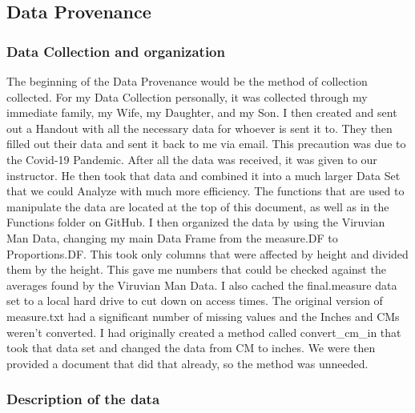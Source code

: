 \documentclass[]{article}
\begin{document}
\subsection{Data Provenance}
\subsubsection{Data Collection and organization}

The beginning of the Data Provenance would be the method of collection
collected. For my Data Collection personally, it was collected through
my immediate family, my Wife, my Daughter, and my Son. I then created
and sent out a Handout with all the necessary data for whoever is sent
it to. They then filled out their data and sent it back to me via email.
This precaution was due to the Covid-19 Pandemic. After all the data was
received, it was given to our instructor. He then took that data and
combined it into a much larger Data Set that we could Analyze with much
more efficiency. The functions that are used to manipulate the data are
located at the top of this document, as well as in the Functions folder
on GitHub. I then organized the data by using the Viruvian Man Data,
changing my main Data Frame from the measure.DF to Proportions.DF. This
took only columns that were affected by height and divided them by the
height. This gave me numbers that could be checked against the averages
found by the Viruvian Man Data. I also cached the final.measure data set
to a local hard drive to cut down on access times. The original version
of measure.txt had a significant number of missing values and the Inches
and CMs weren't converted. I had originally created a method called
convert\_cm\_in that took that data set and changed the data from CM to
inches. We were then provided a document that did that already, so the
method was unneeded.
\label{sec:Provenance- Data collection and Organization}

\subsubsection{Description of the data}
\end{document}
